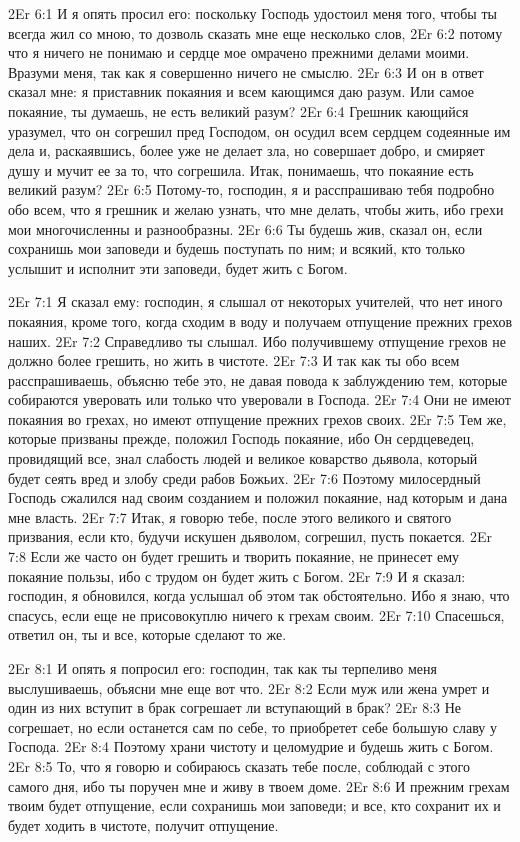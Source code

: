 \vs 2Er 6:1
И я опять просил его:
поскольку Господь удостоил меня того, чтобы ты всегда жил со мною, то дозволь
сказать мне еще несколько слов,
\vs 2Er 6:2
потому что я ничего не
понимаю и сердце мое омрачено прежними делами моими. Вразуми меня, так как я
совершенно ничего не смыслю.
\vs 2Er 6:3
И он в ответ сказал мне: я
приставник покаяния и всем кающимся даю разум. Или самое покаяние, ты думаешь,
не есть великий разум?
\vs 2Er 6:4
Грешник кающийся уразумел,
что он согрешил пред Господом, он осудил всем сердцем содеянные им дела и,
раскаявшись, более уже не делает зла, но совершает добро, и смиряет душу и
мучит ее за то, что согрешила. Итак, понимаешь, что покаяние есть великий
разум?
\vs 2Er 6:5
Потому-то, господин, я и
расспрашиваю тебя подробно обо всем, что я грешник и желаю узнать, что мне
делать, чтобы жить, ибо грехи мои многочисленны и разнообразны.
\vs 2Er 6:6
Ты будешь жив, сказал
он, если сохранишь мои заповеди и будешь поступать по ним; и всякий, кто
только услышит и исполнит эти заповеди, будет жить с Богом.

\vs 2Er 7:1
Я сказал ему: господин, я
слышал от некоторых учителей, что нет иного покаяния, кроме того, когда сходим
в воду и получаем отпущение прежних грехов наших.
\vs 2Er 7:2
Справедливо ты слышал. Ибо
получившему отпущение грехов не должно более грешить, но жить в чистоте.
\vs 2Er 7:3
И так как ты обо всем
расспрашиваешь, объясню тебе это, не давая повода к заблуждению тем, которые
собираются уверовать или только что уверовали в Господа.
\vs 2Er 7:4
Они не имеют покаяния во
грехах, но имеют отпущение прежних грехов своих.
\vs 2Er 7:5
Тем же, которые призваны
прежде, положил Господь покаяние, ибо Он сердцеведец, провидящий все, знал
слабость людей и великое коварство дьявола, который будет сеять вред и злобу
среди рабов Божьих.
\vs 2Er 7:6
Поэтому милосердный
Господь сжалился над своим созданием и положил покаяние, над которым и дана
мне власть.
\vs 2Er 7:7
Итак, я говорю тебе, после
этого великого и святого призвания, если кто, будучи искушен дьяволом,
согрешил, пусть покается.
\vs 2Er 7:8
Если же часто он будет
грешить и творить покаяние, не принесет ему покаяние пользы, ибо с трудом он
будет жить с Богом.
\vs 2Er 7:9
И я сказал: господин, я
обновился, когда услышал об этом так обстоятельно. Ибо я знаю, что спасусь,
если еще не присовокуплю ничего к грехам своим.
\vs 2Er 7:10
Спасешься, ответил он,
ты и все, которые сделают то же.

\vs 2Er 8:1
И опять я попросил его:
господин, так как ты терпеливо меня выслушиваешь, объясни мне еще вот что.
\vs 2Er 8:2
Если муж или жена умрет и
один из них вступит в брак согрешает ли вступающий в брак?
\vs 2Er 8:3
Не согрешает, но если
останется сам по себе, то приобретет себе большую славу у Господа.
\vs 2Er 8:4
Поэтому храни чистоту и
целомудрие и будешь жить с Богом.
\vs 2Er 8:5
То, что я говорю и
собираюсь сказать тебе после, соблюдай с этого самого дня, ибо ты поручен мне
и живу в твоем доме.
\vs 2Er 8:6
И прежним грехам твоим
будет отпущение, если сохранишь мои заповеди; и все, кто сохранит их и будет
ходить в чистоте, получит отпущение.

